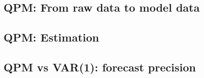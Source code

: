 \documentclass[12pt]{article}
\begin{document}


\subsection{QPM: From raw data to model data}
\label{ssec:qpmeq5}



\subsection{QPM: Estimation}
\label{ssec:qpmeq6}



\subsection{QPM vs VAR(1): forecast precision}
\label{ssec:forecastprecision}
\end{document}
